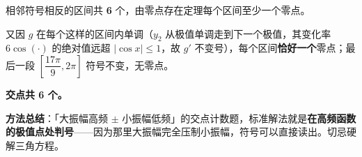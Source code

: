 \begin{answer}
相邻符号相反的区间共 \textbf{6} 个，由零点存在定理每个区间至少一个零点。

又因 $g$ 在每个这样的区间内单调（$y_2$ 从极值单调走到下一个极值，其变化率 $6\cos(\cdot)$ 的绝对值远超 $|\cos x|\le1$，故 $g'$ 不变号），每个区间\textbf{恰好一个}零点；最后一段 $\left[\dfrac{17\pi}9,2\pi\right]$ 符号不变，无零点。

\textbf{交点共 6 个。}

\begin{gktip}
\textbf{方法总结}：「大振幅高频 $\pm$ 小振幅低频」的交点计数题，标准解法就是\textbf{在高频函数的极值点处判号}——因为那里大振幅完全压制小振幅，符号可以直接读出。切忌硬解三角方程。
\end{gktip}


\par\medskip

\end{answer}
